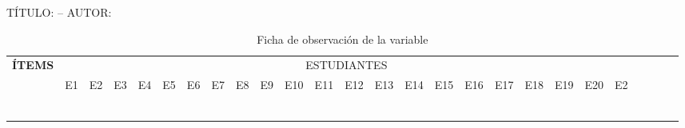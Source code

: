 \documentclass[12pt,a4paper]{article}
\newcommand{\ce}{\centering}
\newcommand\Tstrut{\rule{0pt}{2.35ex}}
\begin{document}
\begin{landscape}

	TÍTULO: \titulo -- AUTOR: \autor
	\begin{table}[ht!]\caption{Ficha de observación de la variable \MakeTextLowercase{\variabled}}
		\centering \scriptsize\renewcommand\tabcolsep{0.1cm}\renewcommand{}
		\begin{tabular}{|l|l|l|l|l|l|l|l|l|l|l|l|l|l|l|l|l|l|l|l|l|l|l|l|l|l|}
			\hline
			\multirow{2}{*}{ \ce\bf ÍTEMS}                                                                         & \multicolumn{21}{c|}{ESTUDIANTES}\Tstrut                                                                                                                       \\\cline{2-22}
			                                                                                                       & E1                                       & E2 & E3 & E4 & E5 & E6 & E7 & E8 & E9 & E10 & E11 & E12 & E13 & E14 & E15 & E16 & E17 & E18 & E19 & E20 & E2\Tstrut \\\hline
		 &                                          &    &    &    &    &    &    &    &    &     &     &     &     &     &     &     &     &     &     &     &           \\\hline
		 &                                          &    &    &    &    &    &    &    &    &     &     &     &     &     &     &     &     &     &     &     &           \\\hline
		 &                                          &    &    &    &    &    &    &    &    &     &     &     &     &     &     &     &     &     &     &     &           \\\hline
		 &                                          &    &    &    &    &    &    &    &    &     &     &     &     &     &     &     &     &     &     &     &           \\\hline
		 &                                          &    &    &    &    &    &    &    &    &     &     &     &     &     &     &     &     &     &     &     &           \\\hline
		 &                                          &    &    &    &    &    &    &    &    &     &     &     &     &     &     &     &     &     &     &     &           \\\hline

\end{tabular}
\end{table}
\end{landscape}
\end{document}
